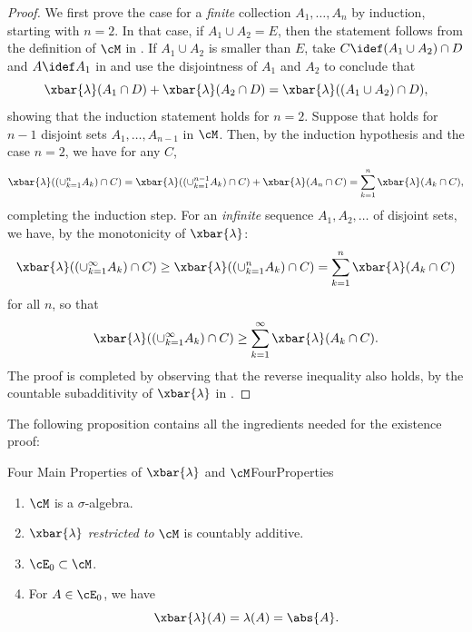 \begin{proof}
	We first prove the case for a \textit{finite} collection $A_1, \dots, A_n$ by induction, starting with $n=2$. In that case, if $A_1 \cup A_2 = E$, then the statement follows from the definition of $\cM$ in . If $A_1 \cup A_2$ is smaller than $E$, take $C \idef (A_1 \cup A_2) \cap D$ and $A \idef A_1$ in  and use the disjointness of $A_1$ and $A_2$ to conclude that
	\begin{equation*}
		\xbar{\lambda}(A_1 \cap D) + \xbar{\lambda}(A_2 \cap D) = \xbar{\lambda}((A_1 \cup A_2) \cap D),
	\end{equation*}
	showing that the induction statement holds for $n=2$. Suppose that  holds for $n-1$ disjoint sets $A_1, \dots, A_{n-1}$ in $\cM$. Then, by the induction hypothesis and the case $n=2$, we have for any $C$,
	\begin{equation*}
		\xbar{\lambda}((\cup_{k=1}^n A_k) \cap C) = \xbar{\lambda}((\cup_{k=1}^{n-1} A_k) \cap C) + \xbar{\lambda}(A_n \cap C) = \sum_{k=1}^n \xbar{\lambda}(A_k \cap C),
	\end{equation*}
	completing the induction step. For an \textit{infinite} sequence $A_1, A_2, \dots$ of disjoint sets, we have, by the monotonicity of $\xbar{\lambda}$:
	\begin{equation*}
		\xbar{\lambda}((\cup_{k=1}^\infty A_k) \cap C) \ge \xbar{\lambda}((\cup_{k=1}^n A_k) \cap C) = \sum_{k=1}^n \xbar{\lambda}(A_k \cap C)
	\end{equation*}
	for all $n$, so that
	\begin{equation*}
		\xbar{\lambda}((\cup_{k=1}^\infty A_k) \cap C) \ge \sum_{k=1}^\infty \xbar{\lambda}(A_k \cap C).
	\end{equation*}
	The proof is completed by observing that the reverse inequality also holds, by the countable subadditivity of $\xbar{\lambda}$ in .
\end{proof}

The following proposition contains all the ingredients needed for the existence proof:

\begin{prop}{Four Main Properties of $\xbar{\lambda}$ and $\cM$}{FourProperties}
	\begin{enumerate}
		\item $\cM$ is a $\sigma$-algebra.
		\item $\xbar{\lambda}$ \textit{restricted to} $\cM$ is countably additive.
		\item $\cE_0 \subset \cM$.
		\item For $A \in \cE_0$, we have
		      \begin{equation}
			      \xbar{\lambda}(A) = \lambda(A) = \abs{A}.
			      \label{eq:ExtensionConsistency}
		      \end{equation}
	\end{enumerate}
\end{prop}

